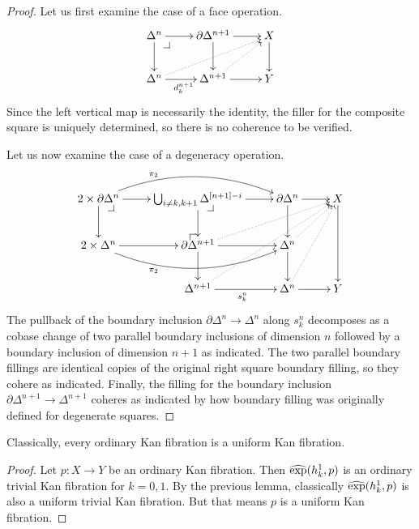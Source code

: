 \documentclass[reqno,10pt,a4paper,oneside]{amsart}
\begin{document}
\begin{proof}
Let us first examine the case of a face operation.
\[
\xymatrix{
  \Delta^n
  \ar[r]
  \ar[d]
  \pullback{dr}
&
  \partial \Delta^{n+1}
  \ar[d]
  \ar[r]
&
  X
  \ar[d]
\\
  \Delta^n
  \ar[r]_{d_k^{n+1}}
  \ar@{.>}[urr]
&
  \Delta^{n+1}
  \ar[r]
  \ar@{.>}[ur]
&
  Y
}
\]
Since the left vertical map is necessarily the identity, the filler for the composite square is uniquely determined, so there is no coherence to be verified.

Let us now examine the case of a degeneracy operation.
\[
\xymatrix{
  2 \times \partial \Delta^n
  \ar[r]
  \ar[d]
  \ar@/^2em/[rr]^(0.3){\pi_2}
  \pullback{dr}
&
  \bigcup_{i \neq k, k+1} \Delta^{[n+1] - i}
  \ar[r]
  \ar[d]
  \pullback{dr}
&
  \partial \Delta^n
  \ar[d]
  \ar[r]
&
  X
  \ar[dd]
\\
  2 \times \Delta^n
  \ar[r]
  \ar@/_2em/[rr]_(0.3){\pi_2}
&
  \partial \Delta^{n+1}
  \ar[r]
  \ar[d]
  \ar@{.>}[urr]
  \pullback{ul}
&
  \Delta^n
  \ar[d]
  \ar@{.>}[ur]
\\&
  \Delta^{n+1}
  \ar[r]_{s_k^n}
  \ar@{.>}[uurr]
&
  \Delta^n
  \ar[r]
  \ar@{.>}[uur]
&
  Y
}
\]
The pullback of the boundary inclusion $\partial \Delta^n \to \Delta^n$ along $s_k^n$ decomposes as a cobase change of two parallel boundary inclusions of dimension $n$ followed by a boundary inclusion of dimension $n+1$ as indicated.
The two parallel boundary fillings are identical copies of the original right square boundary filling, so they cohere as indicated.
Finally, the filling for the boundary inclusion $\partial \Delta^{n+1} \to \Delta^{n+1}$ coheres as indicated by how boundary filling was originally defined for degenerate squares.
\end{proof}

\begin{lemma}
Classically, every ordinary Kan fibration is a uniform Kan fibration.
\end{lemma}

\begin{proof}
Let $p : X \to Y$ be an ordinary Kan fibration.
Then $\operatorname{\widehat{exp}}(h_k^1, p)$ is an ordinary trivial Kan fibration for $k = 0, 1$.
By the previous lemma, classically $\operatorname{\widehat{exp}}(h_k^1, p)$ is also a uniform trivial Kan fibration.
But that means $p$ is a uniform Kan fibration.
\end{proof}
\end{document}
